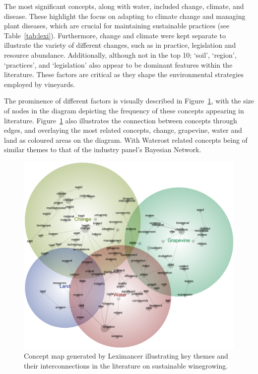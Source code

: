 \documentclass[10pt,letterpaper]{article}
\begin{document}
The most significant concepts, along with water, included change, climate, and disease. These highlight the focus on adapting to climate change and managing plant diseases, which are crucial for maintaining sustainable practices (see Table~\ref{tab:lexi}). Furthermore, change and climate were kept separate to illustrate the variety of different changes, such as in practice, legislation and resource abundance. Additionally, although not in the top 10; `soil', `region', `practices', and `legislation' also appear to be dominant features within the literature. These factors are critical as they shape the environmental strategies employed by vineyards.

The prominence of different factors is visually described in Figure~\ref{fig:lexi}, with the size of nodes in the diagram depicting the frequency of these concepts appearing in literature. Figure~\ref{fig:lexi} also illustrates the connection between concepts through edges, and overlaying the most related concepts, change, grapevine, water and land as coloured areas on the diagram. With Waterost related concepts being of similar themes to that of the industry panel's Bayesian Network.

\begin{figure}[h]
    \centering
    \includegraphics[width=\linewidth]{Winegrowing-concept-map}
    \caption{Concept map generated by Leximancer illustrating key themes and their interconnections in the literature on sustainable winegrowing.}\label{fig:lexi}
\end{figure}
\end{document}
